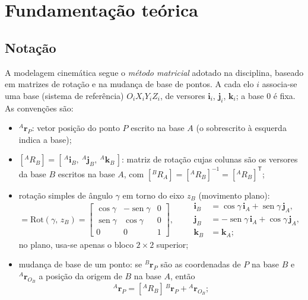 \documentclass[12pt,a4paper,twoside]{article}
\DeclareMathOperator{\sen}{sen}
\newcommand{\rv}[2]{{}^{#1}\mathbf{r}_{#2}}          %
\newcommand{\Rm}[2]{[{}^{#1}R_{#2}]}                 %
\newcommand{\Rot}[2]{\mathrm{Rot}(#1,\,#2)}
\numberwithin{equation}{section}
\begin{document}
\section{Fundamentação teórica}\label{cap:teoria1}

\subsection{Notação}\label{sec:notacao}

A modelagem cinemática segue o \emph{método matricial} adotado na disciplina, baseado em
matrizes de rotação e na mudança de base de pontos. A cada elo $i$ associa-se uma base (sistema de referência)
$O_iX_iY_iZ_i$, de versores $\mathbf i_i$, $\mathbf j_i$, $\mathbf k_i$; a base $0$ é fixa. As
convenções são:
\begin{itemize}
  \item $\rv{A}{P}$: vetor posição do ponto $P$ escrito na base $A$ (o sobrescrito à esquerda
  indica a base);
  \item $\Rm{A}{B} = [\,{}^{A}\mathbf i_B,\ {}^{A}\mathbf j_B,\ {}^{A}\mathbf k_B\,]$: matriz de rotação
  cujas colunas são os versores da base $B$ escritos na base $A$, com
  $\Rm{B}{A} = \Rm{A}{B}^{-1} = \Rm{A}{B}^{\mathsf T}$;
  \item rotação simples de ângulo $\gamma$ em torno do eixo $z_B$ (movimento plano):
  \begin{equation}
    \Rm{A}{B} = \Rot{\gamma}{z_B} =
    \begin{bmatrix} \cos\gamma & -\sen\gamma & 0\\ \sen\gamma & \cos\gamma & 0\\ 0 & 0 & 1 \end{bmatrix},
    \qquad
    \begin{aligned}
      \mathbf i_B &= \cos\gamma\,\mathbf i_A + \sen\gamma\,\mathbf j_A,\\
      \mathbf j_B &= -\sen\gamma\,\mathbf i_A + \cos\gamma\,\mathbf j_A,\\
      \mathbf k_B &= \mathbf k_A;
    \end{aligned}
  \end{equation}
  no plano, usa-se apenas o bloco $2\times2$ superior;
  \item mudança de base de um ponto: se $\rv{B}{P}$ são as coordenadas de $P$ na base $B$ e
  $\rv{A}{O_B}$ a posição da origem de $B$ na base $A$, então
  \begin{equation}
    \rv{A}{P} = \Rm{A}{B}\,\rv{B}{P} + \rv{A}{O_B} ;
    \label{eq:mudancabase}

\end{equation}
\end{itemize}
\end{document}
